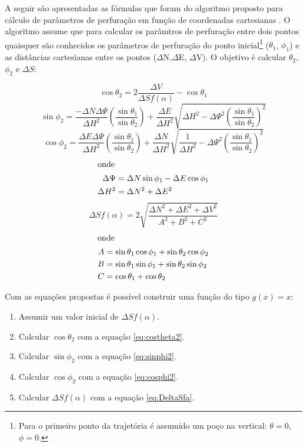 \documentclass[final,3p,12pt]{elsarticle}
\begin{document}
A seguir são apresentadas as fórmulas que foram do algoritmo proposto para cálculo de parâmetros de perfuração em função de coordenadas cartesianas \cite{relatoriobisseccao}. O algoritmo assume que para calcular os parâmtros de perfuração entre dois pontos quaisquer são conhecidos os parâmetros de perfuração do ponto inicial\footnote{Para o primeiro ponto da trajetória é assumido um poço na vertical: $\theta=0$, $\phi=0$.} ($\theta_1$, $\phi_1$) e as distâncias cartesianas entre os pontos ($\Delta$N,$\Delta$E, $\Delta$V). O objetivo é calcular $\theta_2$, $\phi_2$ e $\Delta S$:

\begin{equation} \label{eq:costheta2}
    \cos \theta_2 = 2 \frac{\Delta V}{\Delta S f(\alpha)} - \cos \theta_1
\end{equation}
\begin{equation} \label{eq:sinphi2}
    \sin \phi_2 = \frac{-\Delta N \Delta \Psi}{\Delta H^2} \left( \frac{\sin \theta_1}{\sin \theta_2} \right) + \frac{\Delta E}{\Delta H^2} \sqrt{\Delta H^2 - \Delta \Psi^2 \left( \frac{\sin \theta_1}{\sin \theta_2} \right)^2} 
\end{equation}
\begin{equation} \label{eq:cosphi2}
    \cos \phi_2 = \frac{\Delta E \Delta \Psi}{\Delta H^2} \left( \frac{\sin \theta_1}{\sin \theta_2} \right) + \frac{\Delta N}{\Delta H^2} \sqrt{\frac{1}{\Delta H^2} - \Delta \Psi^2 \left( \frac{\sin \theta_1}{\sin \theta_2} \right)^2} 
\end{equation}
\begin{align*}
    \intertext{onde}
    \Delta \Psi &= \Delta N \sin \phi_1 - \Delta E \cos \phi_1 \\
    \Delta H^2 &= \Delta N^2 + \Delta E^2
\end{align*}
\begin{equation} \label{eq:DeltaSfa}
    \Delta S f(\alpha) = 2 \sqrt{\frac{\Delta N^2 + \Delta E^2 + \Delta V^2}{A^2+B^2+C^2}}
\end{equation}
\begin{align*}
    \intertext{onde}
    A &= \sin \theta_1 \cos \phi_1 + \sin \theta_2 \cos \phi_2 \\
    B &= \sin \theta_1 \sin \phi_1 + \sin \theta_2 \sin \phi_2 \\
    C &= \cos \theta_1 + \cos \theta_2
\end{align*}

Com as equações propostas é possível construir uma função do tipo $g(x)=x$:

\begin{enumerate}
    \item Assumir um valor inicial de $\Delta S f(\alpha)$.
    \item Calcular $\cos \theta_2$ com a equação \ref{eq:costheta2}.
    \item Calcular $\sin \phi_2$ com a equação \ref{eq:sinphi2}.
    \item Calcular $\cos \phi_2$ com a equação \ref{eq:cosphi2}.
    \item Calcular $\Delta S f(\alpha)$ com a equação \ref{eq:DeltaSfa}.
\end{enumerate}
\end{document}
